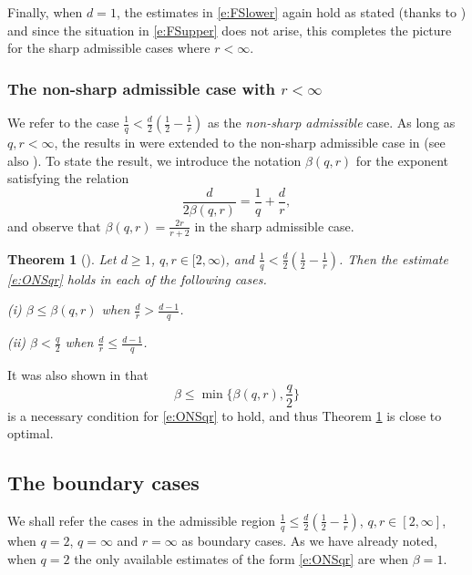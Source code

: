 \documentclass[a4paper]{amsart}
\numberwithin{equation}{section}%
\theoremstyle{plain}%
\newtheorem{theorem}{Theorem}[section]
\theoremstyle{definition}
\theoremstyle{remark}%
\begin{document}
Finally, when $d = 1$, the estimates in \eqref{e:FSlower} again hold as stated (thanks to \cite{FLLS, FS_AJM}) and since the situation in \eqref{e:FSupper} does not arise, this completes the picture for the sharp admissible cases where $r < \infty$. 

\subsubsection{The non-sharp admissible case with $r < \infty$}
We refer to the case $\frac{1}{q} < \frac{d}{2}(\frac{1}{2} - \frac{1}{r})$ as the \emph{non-sharp admissible} case. As long as $q, r < \infty$, the results in \cite{FLLS, FS_AJM, FS_Survey} were extended to the non-sharp admissible case in \cite{BHLNS} (see also \cite{BLN_Forum}). To state the result, we introduce the notation $\beta(q,r)$ for the exponent satisfying the relation
\[
\frac{d}{2\beta(q,r)} = \frac{1}{q} + \frac{d}{r},
\]
and observe that $\beta(q,r) = \frac{2r}{r + 2}$ in the sharp admissible case.
\begin{theorem}[\cite{BHLNS}] \label{t:BHLNS}
Let $d \geq 1$, $q,r \in [2,\infty)$, and $\frac{1}{q} < \frac{d}{2}(\frac{1}{2} - \frac{1}{r})$. Then the estimate \eqref{e:ONSqr} holds in each of the following cases.

\emph{(i)} $\beta \leq \beta(q,r)$ when $\frac{d}{r} > \frac{d-1}{q}$.

\emph{(ii)} $\beta < \frac{q}{2}$ when $\frac{d}{r} \leq \frac{d-1}{q}$.
\end{theorem}
It was also shown in \cite{BHLNS} that 
\[
\beta \leq \min  \bigg\{ \beta(q,r), \frac{q}{2} \bigg\}
\]
is a necessary condition for \eqref{e:ONSqr} to hold, and thus Theorem \ref{t:BHLNS} is close to optimal.

\subsection{The boundary cases}
We shall refer the cases in the admissible region $\frac{1}{q} \leq \frac{d}{2}(\frac{1}{2} - \frac{1}{r})$, $q,r \in [2,\infty]$, when $q = 2$, $q = \infty$ and $r = \infty$ as boundary cases. As we have already noted, when $q = 2$ the only available estimates of the form \eqref{e:ONSqr} are when $\beta = 1$. 
\end{document}
